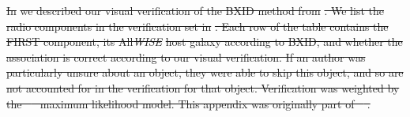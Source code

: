 \documentclass[11pt, a4paper]{book}
\providecommand{\DIFdeltex}[1]{{\protect\color{red}\sout{#1}}}                      %
\providecommand{\DIFdel}[1]{\texorpdfstring{\DIFdeltex{#1}}{}} %
\begin{document}
\DIFdel{In }%
\DIFdel{we described our visual verification of the BXID method from }%
\DIFdel{. We list the radio components in the verification set in }%
\DIFdel{. Each row of the table contains the FIRST component, its All}\emph{\DIFdel{WISE}} %
\DIFdel{host galaxy according to BXID, and whether the association is correct according to our visual verification. If an author was particularly unsure about an object, they were able to skip this object, and so are not accounted for in the verification for that object. Verification was weighted by the \mbox{%
\citet{dawid79em} }\hspace{0pt}%
maximum likelihood model. This appendix was originally part of \mbox{%
\citep{alger21rlfs}}\hspace{0pt}%
.
}%
\end{document}
